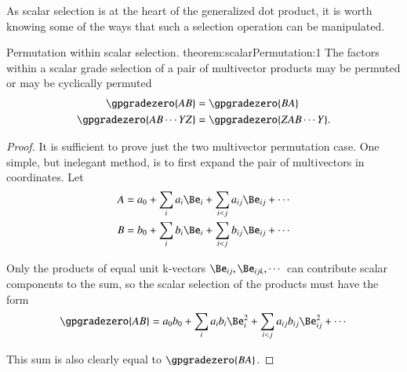 %
%
As scalar selection is at the heart of the
generalized dot product, it is worth knowing
some of the ways that such a selection operation can be manipulated.

\maketheorem
{Permutation within scalar selection.}
{theorem:scalarPermutation:1}{
The factors within a scalar grade selection of a pair of multivector products may be permuted or may be cyclically permuted
\begin{equation*}
\begin{aligned}
\gpgradezero{A B} &= \gpgradezero{B A} \\
\gpgradezero{A B \cdots Y Z} &= \gpgradezero{Z A B \cdots Y}.
\end{aligned}
\end{equation*}
} %
\begin{proof}
It is sufficient to prove just the two multivector permutation case.
One simple, but inelegant method, is to first expand the pair of multivectors in coordinates.
Let
\begin{equation}\label{eqn:scalarSelectionPermutation:40}
\begin{aligned}
A &= a_0 + \sum_i a_i \Be_i + \sum_{i < j} a_{ij} \Be_{ij} + \cdots \\
B &= b_0 + \sum_i b_i \Be_i + \sum_{i < j} b_{ij} \Be_{ij} + \cdots
\end{aligned}
\end{equation}

Only the products of equal unit k-vectors \( \Be_{ij}, \Be_{ijk}, \cdots \)  can contribute scalar components to the sum, so the scalar selection of the products must have the form
\begin{dmath}\label{eqn:scalarSelectionPermutation:60}
\gpgradezero{ A B }
=
a_0 b_0 + \sum_i a_i b_i \Be_i^2 + \sum_{i < j} a_{ij} b_{ij} \Be_{ij}^2 + \cdots
\end{dmath}

This sum is also clearly equal to \( \gpgradezero{ B A } \).
\end{proof}
